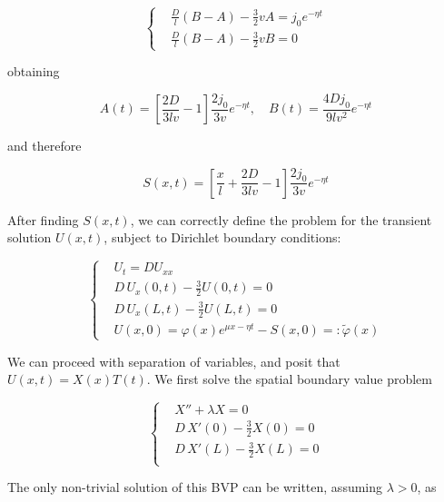 \documentclass[a4paper, 10pt]{article}
\begin{document}
  \begin{equation}
    \left\{\begin{aligned}
      &\frac{D}{l}\left(B-A\right) - \frac{3}{2}v A = j_0e^{-\eta t}\\
      &\frac{D}{l}\left(B-A\right) - \frac{3}{2}v B = 0
    \end{aligned}\right.
  \end{equation}

  obtaining
  
  \begin{equation}
    A(t) = \left[\frac{2D}{3lv}-1\right]\frac{2 j_0}{3 v} e^{-\eta t}, \quad
    B(t) = \frac{4D j_0}{9 l v^2} e^{-\eta t}
  \end{equation}

  and therefore 

  \begin{equation}
    S(x,t) = \left[\frac{x}{l} + \frac{2D}{3lv} - 1\right] \frac{2
    j_0}{3v}e^{-\eta t}
  \end{equation}

  After finding $S(x,t)$, we can correctly define the problem for the transient
  solution $U(x,t)$, subject to Dirichlet boundary conditions:

  \begin{equation}
    \left\{ \begin{aligned}
      &U_t = D U_{xx}\\
      &D \, U_x(0, t)  - \frac{3}{2} U(0,t)  = 0\\
      &D \, U_x(L, t)  - \frac{3}{2} U(L,t)  = 0\\
      &U(x,0) = \varphi(x)e^{\mu x - \eta t} - S(x,0) =:\tilde{\varphi}(x)
    \end{aligned}\right.
  \end{equation}

  We can proceed with separation of variables, and posit that $U(x,t) =
  X(x)T(t)$. We first solve the spatial boundary value problem

  \begin{equation}
    \left\{\begin{aligned}
      &X'' + \lambda X = 0\\
      &D \, X'(0)  - \frac{3}{2} X(0)  = 0\\
      &D \, X'(L)  - \frac{3}{2} X(L)  = 0\\
    \end{aligned}\right.
  \end{equation}

  The only non-trivial solution of this BVP can be written, assuming $\lambda >
  0$, as
\end{document}
